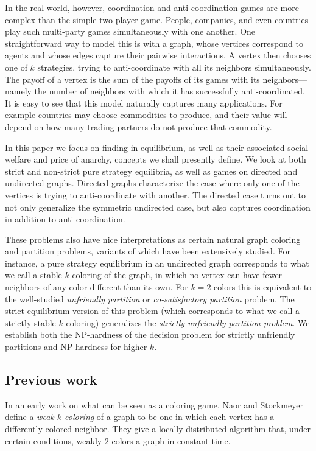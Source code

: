 \documentclass{llncs}
\begin{document}
In the real world, however, coordination and anti-coordination games are more
complex than the simple two-player game.  People, companies, and even countries
play such multi-party games simultaneously with one another. One
straightforward way to model this is with a graph, whose vertices correspond to
agents and whose edges capture their pairwise interactions.  A vertex then
chooses one of $k$ strategies, trying to anti-coordinate with all its neighbors
simultaneously.  The payoff of a vertex is the sum of the payoffs of its games
with its neighbors---namely the number of neighbors with which it has
successfully anti-coordinated.  It is easy to see that this model naturally
captures many applications.  For example countries may choose commodities to
produce, and their value will depend on how many trading partners do not
produce that commodity.

In this paper we focus on finding  in equilibrium,
as well as their associated social welfare and price of anarchy, concepts we
shall presently define.  We look at both strict and non-strict  pure strategy
equilibria, as well as games on directed and undirected graphs.  Directed graphs
characterize the case where only one of the vertices is trying to anti-coordinate
with another.  The directed case turns out to not only generalize the symmetric
undirected case, but also captures coordination in addition to
anti-coordination.

These problems also have nice interpretations as certain natural graph coloring
and partition problems, variants of which have been extensively studied.  For
instance, a pure strategy equilibrium in an undirected graph corresponds to
what we call a stable $k$-coloring of the graph, in which no vertex can have fewer
neighbors of any color different than its own.  For $k=2$ colors this is equivalent
to the well-studied \emph{unfriendly partition} or \emph{co-satisfactory
partition} problem.  The strict equilibrium version of this problem (which
corresponds to what we call a strictly stable $k$-coloring) generalizes the
\emph{strictly unfriendly partition problem}. We establish both the NP-hardness
of the decision problem for strictly unfriendly partitions and NP-hardness for higher $k$.

\subsection{Previous work}


In an early work on what can be seen as a coloring game, Naor and
Stockmeyer~\cite{NaorS93} define a \emph{weak $k$-coloring} of a graph to be
one in which each vertex has a differently colored neighbor.
They give a locally distributed algorithm that, under certain
conditions, weakly $2$-colors a graph in constant time.
\end{document}
